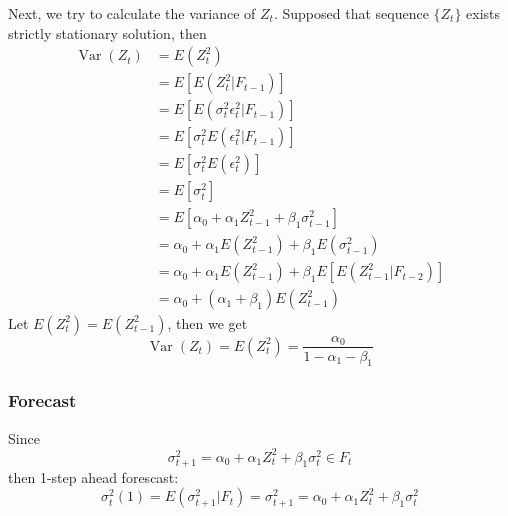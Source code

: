 \documentclass{article}
\begin{document}
\noindent Next, we try to calculate the variance of $Z_t$. Supposed that sequence $\{Z_t\}$ exists strictly stationary solution, then
\begin{equation*}
\begin{aligned} \operatorname{Var}\left(Z_{t}\right) &=E\left(Z_{t}^{2}\right) \\ &=E\left[E\left(Z_{t}^{2} | F_{t-1}\right)\right] \\ &=E\left[E\left(\sigma_{t}^{2} \epsilon_{t}^{2} | F_{t-1}\right)\right] \\ &=E\left[\sigma_{t}^{2} E\left(\epsilon_{t}^{2} | F_{t-1}\right)\right] \\ &=E\left[\sigma_{t}^{2} E\left(\epsilon_{t}^{2}\right)\right] \\ &=E\left[\sigma_{t}^{2}\right] \\ &=E\left[\alpha_{0}+\alpha_{1} Z_{t-1}^{2}+\beta_{1} \sigma_{t-1}^{2}\right] \\ &= \alpha_{0}+\alpha_{1} E\left(Z_{t-1}^{2}\right)+\beta_{1} E\left(\sigma_{t-1}^{2}\right)\\ &=\alpha_{0}+\alpha_{1} E\left(Z_{t-1}^{2}\right)+\beta_{1} E\left[E\left(Z_{t-1}^{2} | F_{t-2}\right)\right] \\ &=\alpha_{0}+\left(\alpha_{1}+\beta_{1}\right) E\left(Z_{t-1}^{2}\right) \end{aligned}
\end{equation*}
Let $E (Z_{t}^{2}) = E (Z_{t-1}^{2})$, then we get
\begin{equation*}
\operatorname{Var}\left(Z_{t}\right)=E (Z_{t}^{2})=\frac{\alpha_{0}}{1-\alpha_{1}-\beta_{1}}
\end{equation*}

\subsubsection{Forecast}
Since
\begin{equation*}
\sigma_{t+1}^{2}=\alpha_{0}+\alpha_{1} Z_{t}^{2}+\beta_{1} \sigma_{t}^{2} \in F_{t}
\end{equation*}
then 1-step ahead forescast:
\begin{equation*}
\sigma_{t}^{2}(1)=E\left(\sigma_{t+1}^{2} | F_{t}\right)=\sigma_{t+1}^{2}=\alpha_{0}+\alpha_{1} Z_{t}^{2}+\beta_{1} \sigma_{t}^{2}
\end{equation*}
\end{document}

